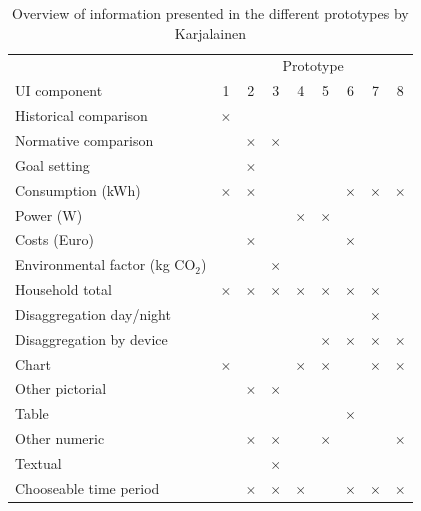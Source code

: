 \documentclass[journal]{vgtc}                %
\begin{document}
\begin{table}
  \caption{Overview of information presented in the different prototypes by Karjalainen\cite{karjalainen2011consumer}}
  \label{prototypes}
  \scriptsize
  \begin{center}
    \begin{tabular}{|l|cccccccc|}
    \hline
      & \multicolumn{8}{|c|}{Prototype} \\
    
      UI component & 1 & 2 & 3 & 4 & 5 & 6 & 7 & 8 \\
    \hline
      Historical comparison & $\times$ &  &  &  &  &  &  & \\ \hline
      Normative comparison &  & $\times$ & $\times$ &  &  &  &  & \\ \hline
      Goal setting &  & $\times$ &  &  &  &  &  & \\ \hline
      Consumption (kWh) & $\times$ & $\times$ &  &  &  & $\times$ & $\times$ & $\times$ \\ \hline
      Power (W) &  &  &  & $\times$ & $\times$ &  &  & \\ \hline
      Costs (Euro) &  & $\times$ &  &  &  & $\times$ &  & \\ \hline
      Environmental factor (kg CO$_2$) &  &  & $\times$ &  &  &  &  & \\ \hline
      Household total & $\times$ & $\times$ & $\times$ & $\times$ & $\times$ & $\times$ & $\times$ & \\ \hline
      Disaggregation day/night &  &  &  &  &  &  & $\times$ & \\ \hline
      Disaggregation by device &  &  &  &  & $\times$ & $\times$ & $\times$ & $\times$ \\ \hline
      Chart & $\times$ &  &  & $\times$ & $\times$ &  & $\times$ & $\times$ \\ \hline
      Other pictorial &  & $\times$ & $\times$ &  &  &  &  & \\ \hline
      Table &  &  &  &  &  & $\times$ &  & \\ \hline
      Other numeric &  & $\times$ & $\times$ &  & $\times$ &  &  & $\times$ \\ \hline
      Textual &  &  & $\times$ &  &  &  &  & \\ \hline
      Chooseable time period &  & $\times$ & $\times$ & $\times$ &  & $\times$ & $\times$ &  $\times$ \\ \hline
    \end{tabular}
  \end{center}
\end{table}
\end{document}
